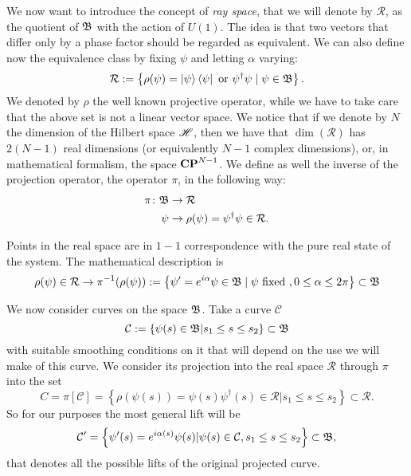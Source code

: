 We now want to introduce the concept of \textit{ray space}, that we will denote by $ \mathcal{R} $, as the quotient of $ \mathfrak{B} $ with the action of $ U(1) $. 
The idea is that two vectors that differ only by a phase factor should be regarded as equivalent.
We can also define now the equivalence class by fixing $ \psi $ and letting $ \alpha $ varying:
\begin{equation}
\mathcal{R}:=\left\{\rho(\psi)=\Ket{\psi}\Bra{\psi} \text{ or } \psi^{\dagger}\psi \mid \psi\in\mathfrak{B} \right\}.
\end{equation}
We denoted by $ \rho $ the well known projective operator, while we have to take care that the above set is not a linear vector space. 
We notice that if we denote by $ N $ the dimension of the Hilbert space $ \mathscr{H} $, then we have that $ \dim(\mathcal{R}) $ has $ 2(N-1) $ real dimensions (or equivalently $ N-1 $ complex dimensions), or, in mathematical formalism, the space $ \mathbf{CP}^{N-1} $.
We define as well the inverse of the projection operator, the operator $ \pi $, in the following way:
\begin{align}
\pi\colon \mathfrak{B}&\to\mathcal{R} \\
\psi&\rightarrow \rho(\psi)=\psi^{\dagger}\psi\in\mathcal{R}.
\end{align}

Points in the real space are in $ 1-1 $ correspondence with the pure real state of the system. The mathematical description is
\begin{equation}
\rho(\psi)\in\mathcal{R}\to\pi^{-1}(\rho(\psi)):=\left\{\psi'=e^{i\alpha}\psi\in\mathfrak{B}\mid\psi \text{ fixed }, 0\leq\alpha\leq 2\pi \right\}\subset \mathfrak{B}
\end{equation}

We now consider curves on the space $ \mathfrak{B} $. Take a curve $ \mathcal{C} $ 
\begin{equation}
\mathcal{C}:=\left\{\psi(s)\in\mathfrak{B} |s_1\leq s\leq s_2 \right\}\subset \mathfrak{B}
\end{equation}
with suitable smoothing conditions on it that will depend on the use we will make of this curve. We consider its projection into the real space $ \mathcal{R} $ through $ \pi $ into the set 
\begin{equation}
C=\pi\left[\mathcal{C}\right]=\left\{\rho(\psi(s))=\psi(s)\psi^{\dagger}(s)\in\mathcal{R}|s_1\leq s\leq s_2 \right\}\subset\mathcal{R}.
\end{equation}
So for our purposes the most general lift will be 
\begin{equation}
\mathcal{C}'=\left\{\psi'(s)=e^{i\alpha(s)}\psi(s)|\psi(s)\in\mathcal{C}, s_1\leq s\leq s_2 \right\}\subset\mathfrak{B},
\end{equation}
that denotes all the possible lifts of the original projected curve. 

